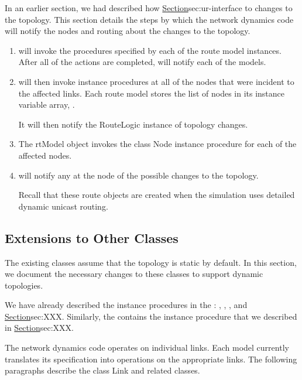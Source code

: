 In an earlier section,
we had described how
\href{unicast routing reacts}{Section}{sec:ur-interface}
to changes to the topology.
This section details the steps by which 
the network dynamics code will notify the nodes and routing
about the changes to the topology.
\begin{enumerate}
\item {} will invoke the procedures
  specified by each of the route model instances.
  After all of the actions are completed,
   will notify each of the models.
\item
  will then invoke instance procedures at all of the nodes
  that were incident to the affected links.
  Each route model stores the list of nodes in its instance variable
  array, .

  It will then notify the RouteLogic instance of topology changes.
\item
  The rtModel object invokes the class Node instance procedure
  for each of the affected nodes.
\item
   will notify any 
  at the node of the possible changes to the topology.

  Recall that these route objects are created when the simulation uses
  detailed dynamic unicast routing.
\end{enumerate}

\subsection{Extensions to Other Classes}

The existing classes assume that the topology is static by default.
In this section, we document the necessary changes to these
classes to support dynamic topologies.

We have already described the instance procedures
in the :
, , , and
 \href{in earlier sections}{Section}{sec:XXX}.
Similarly, the 
contains the instance procedure 
that we described in \href{the previous section}{Section}{sec:XXX}.

The network dynamics code operates on individual links.
Each model currently translates its specification into
operations on the appropriate links.
The following paragraphs describe the class Link and related classes.

